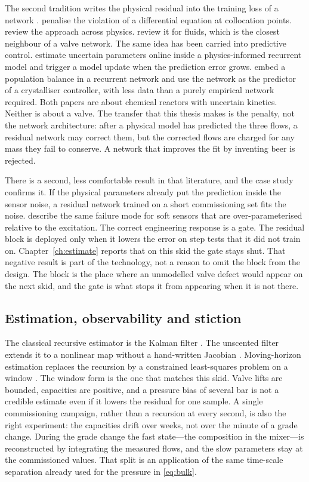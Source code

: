 The second tradition writes the physical residual into the training loss of a network \citep{raissi2019,karniadakis2021,cai2021}. \citet{raissi2019} penalise the violation of a differential equation at collocation points. \citet{karniadakis2021} review the approach across physics. \citet{cai2021} review it for fluids, which is the closest neighbour of a valve network. The same idea has been carried into predictive control. \citet{zheng2023} estimate uncertain parameters online inside a physics-informed recurrent model and trigger a model update when the prediction error grows. \citet{wu2023cerd} embed a population balance in a recurrent network and use the network as the predictor of a crystalliser controller, with less data than a purely empirical network required. Both papers are about chemical reactors with uncertain kinetics. Neither is about a valve. The transfer that this thesis makes is the penalty, not the network architecture: after a physical model has predicted the three flows, a residual network may correct them, but the corrected flows are charged for any mass they fail to conserve. A network that improves the fit by inventing beer is rejected.

There is a second, less comfortable result in that literature, and the case study confirms it. If the physical parameters already put the prediction inside the sensor noise, a residual network trained on a short commissioning set fits the noise. \citet{kadlec2009} describe the same failure mode for soft sensors that are over-parameterised relative to the excitation. The correct engineering response is a gate. The residual block is deployed only when it lowers the error on step tests that it did not train on. Chapter~\ref{ch:estimate} reports that on this skid the gate stays shut. That negative result is part of the technology, not a reason to omit the block from the design. The block is the place where an unmodelled valve defect would appear on the next skid, and the gate is what stops it from appearing when it is not there.

\subsection{Estimation, observability and stiction}

The classical recursive estimator is the Kalman filter \citep{kalman1960}. The unscented filter extends it to a nonlinear map without a hand-written Jacobian \citep{julier2004}. Moving-horizon estimation replaces the recursion by a constrained least-squares problem on a window \citep{rao2003}. The window form is the one that matches this skid. Valve lifts are bounded, capacities are positive, and a pressure bias of several bar is not a credible estimate even if it lowers the residual for one sample. A single commissioning campaign, rather than a recursion at every second, is also the right experiment: the capacities drift over weeks, not over the minute of a grade change. During the grade change the fast state---the composition in the mixer---is reconstructed by integrating the measured flows, and the slow parameters stay at the commissioned values. That split is an application of the same time-scale separation already used for the pressure in \eqref{eq:bulk}.


